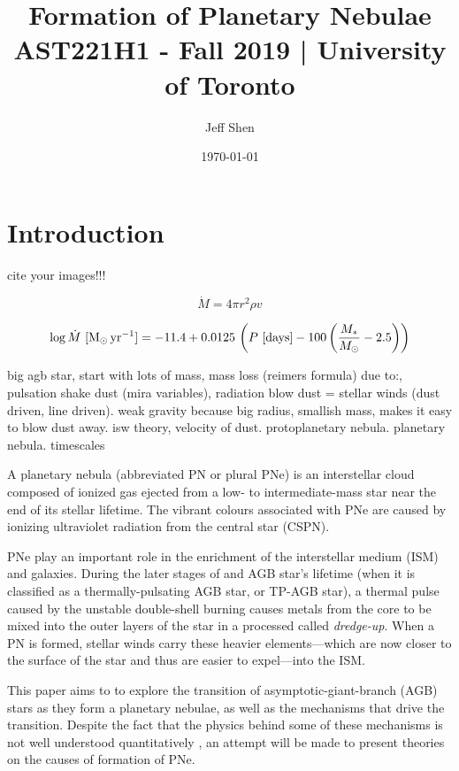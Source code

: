 \documentclass[a4paper,11pt]{article}
\begin{document}
\title{Formation of Planetary Nebulae\\
    \large AST221H1 - Fall 2019 | University of Toronto}
\author{Jeff Shen}
\date{\today}
\maketitle

\section{Introduction}

{\huge cite your images!!!}

\begin{equation*}
    \dot M = 4\pi r^2 \rho v 
\end{equation*}


\begin{equation*}
    \log \dot M~{[\rm M_\odot\,yr^{-1}]} = -11.4 + 0.0125\,\left(P~{[\rm days]} - 100\left(\frac{M_*}{M_\odot} - 2.5\right)\right)
\end{equation*}

{\huge big agb star, start with lots of mass, mass loss (reimers formula) due to:, pulsation shake dust (mira variables), radiation blow dust = stellar winds (dust driven, line driven). weak gravity because big radius, smallish mass, makes it easy to blow dust away. isw theory, velocity of dust. protoplanetary nebula. planetary nebula. timescales}

A planetary nebula (abbreviated PN or plural PNe) is an interstellar cloud composed of ionized gas ejected from a low- to intermediate-mass star near the end of its stellar lifetime. The vibrant colours associated with PNe are caused by ionizing ultraviolet radiation from the central star (CSPN). 

PNe play an important role in the enrichment of the interstellar medium (ISM) and galaxies. During the later stages of and AGB star's lifetime (when it is classified as a thermally-pulsating AGB star, or TP-AGB star), a thermal pulse caused by the unstable double-shell burning causes metals from the core to be mixed into the outer layers of the star in a processed called \textit{dredge-up}. When a PN is formed, stellar winds carry these heavier elements—which are now closer to the surface of the star and thus are easier to expel—into the ISM. \cite{iben} 


This paper aims to to explore the transition of asymptotic-giant-branch (AGB) stars as they form a planetary nebulae, as well as the mechanisms that drive the transition. Despite the fact that the physics behind some of these mechanisms is not well understood quantitatively \cite{schoenberner}, an attempt will be made to present theories on the causes of formation of PNe.
\end{document}
